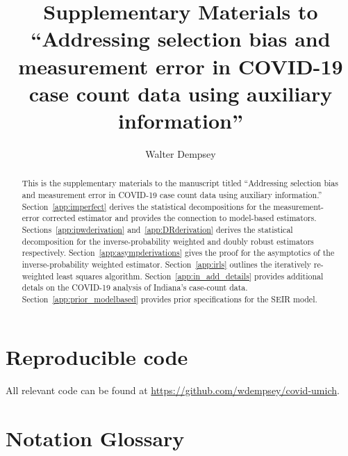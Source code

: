 \documentclass[11pt]{amsart}
\numberwithin{equation}{section}
\theoremstyle{plain}
\begin{document}
\title[Addressing selection bias and measurement error in COVID-19 case counts]{Supplementary Materials to ``Addressing selection bias and measurement error in COVID-19 case count data using auxiliary information''} %

\author{Walter Dempsey}
\address{Department of Biostatistics, University of Michigan, Ann Arbor, MI 48109}

\begin{abstract}
This is the supplementary materials to the manuscript titled ``Addressing selection bias and measurement error in COVID-19 case count data using auxiliary information.''  Section~\ref{app:imperfect} derives the statistical decompositions for the measurement-error corrected estimator and provides the connection to model-based estimators. Sections~\ref{app:ipwderivation} and~\ref{app:DRderivation} derives the statistical decomposition for the inverse-probability weighted and doubly robust estimators respectively.
Section~\ref{app:asympderivations} gives the proof for the asymptotics of the inverse-probability weighted estimator.  
Section~\ref{app:irls} outlines the iteratively re-weighted least squares algorithm.
Section~\ref{app:in_add_details} provides additional detals on the COVID-19 analysis of Indiana's case-count data.
Section~\ref{app:prior_modelbased} provides prior specifications for the SEIR model.
\end{abstract}

\maketitle

\newpage
\appendix

\section{Reproducible code}

All relevant code can be found at \url{https://github.com/wdempsey/covid-umich}.

\section{Notation Glossary}
\label{app:notation}
\end{document}
